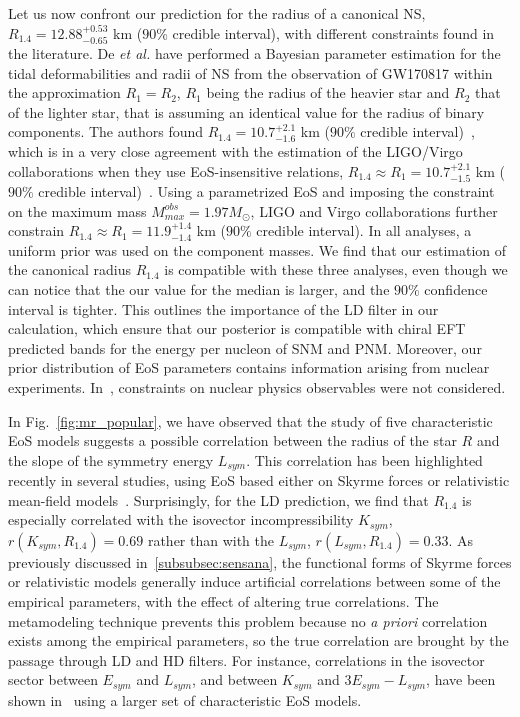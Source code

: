 Let us now confront our prediction for the radius of a canonical NS,
$R_{1.4}=12.88_{-0.65}^{+0.53}$ km ($90\%$ credible interval), with different 
constraints found in the literature.
De \textit{et al.} have performed a Bayesian parameter estimation for the tidal
deformabilities and radii of NS from the observation of GW170817 within the
approximation $R_1 = R_2$, $R_1$ being the radius of the heavier star and 
$R_2$ that of the lighter star, that is assuming an identical value for the 
radius of binary components. 
The authors found $R_{1.4} = 10.7_{-1.6}^{+2.1}$ km ($90\%$ 
credible interval)~\cite{De2018}, which is in a very close agreement with the 
estimation of the LIGO/Virgo collaborations when they use EoS-insensitive 
relations, $R_{1.4} \approx R_1 = 10.7_{-1.5}^{+2.1}$ km ($90\%$ credible
interval)~\cite{GW1}. Using a parametrized EoS and imposing the constraint on
the maximum mass $M_{max}^{obs}=1.97M_\odot$, LIGO and Virgo collaborations 
further constrain $R_{1.4} \approx R_1 = 11.9_{-1.4}^{+1.4}$ km ($90\%$ 
credible interval). In all analyses, a uniform prior was used on the component 
masses. 
We find that our estimation of the canonical radius $R_{1.4}$ is 
compatible with these three analyses, even though we can notice that the our
value for the median is larger, and the $90\%$ confidence interval is 
tighter. This outlines the importance of the LD filter in our calculation, 
which ensure that our posterior is compatible with chiral EFT predicted bands 
for the energy per nucleon of SNM and PNM. Moreover, our prior distribution of 
EoS parameters contains information arising from nuclear experiments.
In~\cite{De2018,GW1}, constraints on nuclear physics observables were not 
considered.

In Fig.~\ref{fig:mr_popular}, we have observed that the study of five
characteristic EoS models suggests a possible correlation between 
the radius of the star $R$ and the slope of the symmetry energy $L_{sym}$. 
This correlation has 
been highlighted recently in several studies, using EoS based either on
Skyrme forces or relativistic mean-field models~\cite{Alam2016,Ji2019,Hu2020}. 
Surprisingly, for the LD prediction, we find that $R_{1.4}$ is especially 
correlated with the isovector incompressibility $K_{sym}$, 
$r(K_{sym},R_{1.4})=0.69$ rather than with the $L_{sym}$, 
$r(L_{sym},R_{1.4})=0.33$. As previously discussed in~\ref{subsubsec:sensana}, 
the functional forms of Skyrme forces or relativistic models generally induce 
artificial correlations between some of the empirical parameters, with the 
effect of altering true correlations. The metamodeling technique prevents this 
problem because no \textit{a priori} correlation exists among the empirical 
parameters, so the true correlation are brought by the passage through LD and 
HD filters. 
For instance, correlations in the isovector sector between $E_{sym}$ and 
$L_{sym}$, and between $K_{sym}$ and $3E_{sym}-L_{sym}$, have been shown 
in~\cite{Mondal2017,Margueron2019} using a larger set of characteristic EoS
models.

